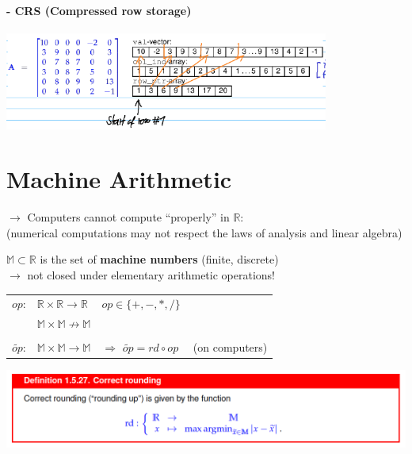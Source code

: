 \documentclass[12pt, a4paper]{article}
\newcommand{\R}{\mathbb{R}}
\newcommand{\M}{\mathbb{M}}
\begin{document}
\paragraph{- CRS (Compressed row storage)}
\hspace{2mm}

\includegraphics[width=0.8\textwidth]{SparseMatrix_CRS.png}




\newpage
\section{Machine Arithmetic}

$\rightarrow$ Computers cannot compute “properly” in $\R$: \\
(numerical computations may not respect the laws of analysis and linear algebra)\newline

$\M \subset \R$ is the set of \textbf{machine numbers} (finite, discrete) \\
$\rightarrow$ not closed under elementary arithmetic operations! \\

\begin{tabular}{lll}
	$op$: 	& 		$\R \times \R \rightarrow \R$ & 			$op \in \lbrace +, -, *, / \rbrace$	\\
			& 		$\M \times \M \not\rightarrow \M$  											\\
																								\\
	$\widetilde{op}$: &  		$\M \times \M \rightarrow \M$ 	& $\Rightarrow$ $\widetilde{op} = rd \circ op \quad $ (on computers) 
\end{tabular}

\begin{center}
	\includegraphics[width=1.0\textwidth]{rounding_function.png}
\end{center}
\end{document}
